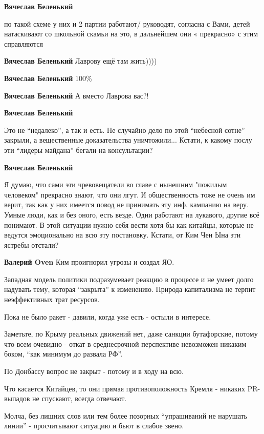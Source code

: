 \begin{itemize}
\begin{itemize}
\textbf{Вячеслав Беленький} 

по такой схеме у них и 2 партии работают/ руководят, согласна с Вами, детей
натаскивают со школьной скамьи на это, в дальнейшем они « прекрасно» с этим
справляются

\textbf{Вячеслав Беленький} Лаврову ещё там жить))))

\textbf{Вячеслав Беленький} 100\%

\textbf{Вячеслав Беленький} А вместо Лаврова вас?!

\textbf{Вячеслав Беленький} 

Это не \enquote{недалеко}, а так и есть. Не случайно дело по этой \enquote{небесной сотне}
закрыли, а вещественные доказательства уничтожили... Кстати, к какому послу эти
\enquote{лидеры майдана} бегали на консультации?

\textbf{Вячеслав Беленький} 

Я думаю, что сами эти чревовещатели во главе с нынешним "пожилым человеком"
прекрасно знают, что они лгут. И общественность тоже не очень им верит, так как
у них имеется повод не принимать эту инф. кампанию на веру. Умные люди, как и
без оного, есть везде. Одни работают на лукавого, другие всё понимают. В этой
ситуации нужно себя вести хотя бы как китайцы, которые не ведутся эмоционально
на всю эту постановку. Кстати, от Ким Чен Ына эти ястребы отстали?

\textbf{Валерий Oven} Ким проигнорил угрозы и создал ЯО.

Западная модель политики подразумевает реакцию в процессе и не умеет долго
надувать тему, которая \enquote{закрыта} к изменению. Природа капитализма не терпит
неэффективных трат ресурсов.

Пока не было ракет - давили, когда уже есть - остыли в интересе.

Заметьте, по Крыму реальных движений нет, даже санкции бутафорские, потому что
всем очевидно - откат в среднесрочной перспективе невозможен никаким боком,
\enquote{как минимум до развала РФ}.

По Донбассу вопрос не закрыт - потому и в ходу на всю.

Что касается Китайцев, то они прямая противоположность Кремля - никаких
PR-выпадов не спускают, всегда отвечают.

Молча, без лишних слов или тем более позорных \enquote{упрашиваний не нарушать линии} -
просчитывают ситуацию и бьют в слабое звено.


\end{itemize}
\end{itemize}
